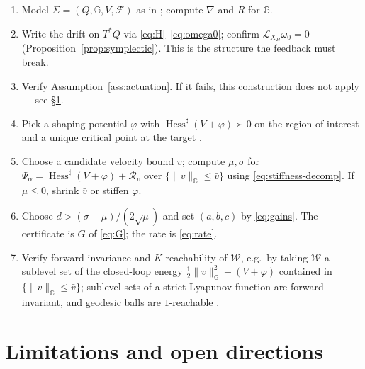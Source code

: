 \documentclass[11pt,a4paper]{article}
\newcommand{\Gm}{\mathbb{G}}                      %
\newcommand{\Hess}{\operatorname{Hess}}
\newcommand{\Jac}{\mathcal{R}}
\newcommand{\Stiff}{\Psi}
\newcommand{\Lie}{\mathcal{L}}
\newcommand{\normG}[1]{\lVert #1 \rVert_{\Gm}}
\newcommand{\Tstar}{T^{*}Q}
\theoremstyle{plain}
\theoremstyle{definition}
\theoremstyle{remark}
\begin{document}
\begin{enumerate}[leftmargin=1.9em,itemsep=3pt]
\item Model $\Sigma = (Q,\Gm,V,\mathcal{F})$ as in \cite[Ch.~4]{BL04}; compute
      $\nabla$ and $R$ for $\Gm$.
\item Write the drift on $\Tstar$ via \eqref{eq:H}--\eqref{eq:omega0}; confirm
      $\Lie_{X_H}\omega_0 = 0$ (Proposition~\ref{prop:symplectic}). This is the
      structure the feedback must break.
\item Verify Assumption~\ref{ass:actuation}. If it fails, this construction does
      not apply --- see \S\ref{sec:limits}.
\item Pick a shaping potential $\varphi$ with $\Hess^{\sharp}(V+\varphi) \succ 0$
      on the region of interest and a unique critical point at the target
      \cite[\S10.4, \S11.1.1]{BL04}.
\item Choose a candidate velocity bound $\bar v$; compute
      $\mu,\sigma$ for $\Stiff_\alpha = \Hess^{\sharp}(V+\varphi) + \Jac_v$ over
      $\{\normG{v}\le\bar v\}$ using \eqref{eq:stiffness-decomp}. If $\mu \le 0$,
      shrink $\bar v$ or stiffen $\varphi$.
\item Choose $d > (\sigma-\mu)/(2\sqrt{\mu})$ and set
      $(a,b,c)$ by \eqref{eq:gains}. The certificate is $G$ of
      \eqref{eq:G}; the rate is \eqref{eq:rate}.
\item Verify forward invariance and $K$-reachability of $\mathcal{W}$, e.g.\ by
      taking $\mathcal{W}$ a sublevel set of the closed-loop energy
      $\tfrac12\normG{v}^2 + (V+\varphi)$ contained in
      $\{\normG{v}\le\bar v\}$; sublevel sets of a strict Lyapunov function are
      forward invariant, and geodesic balls are $1$-reachable
      \cite[Prop.~2.5(iii)]{SB13}.
\end{enumerate}

\section{Limitations and open directions}
\label{sec:limits}
\end{document}

